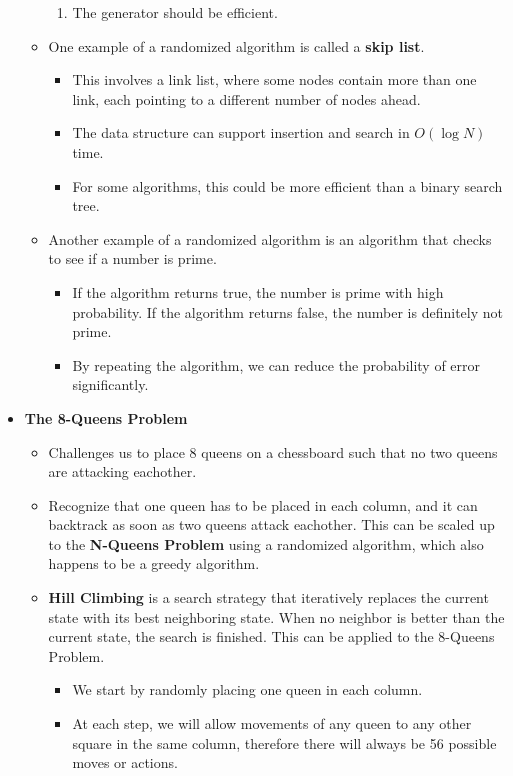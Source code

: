 \documentclass{article}
\begin{document}
\begin{itemize}
\begin{itemize}
\begin{enumerate}
            \item The generator should be efficient.
        \end{enumerate}
        \item One example of a randomized algorithm is called a \textbf{skip list}.
        \begin{itemize}
            \item This involves a link list, where some nodes contain more than one link, each pointing to a different number of nodes ahead.
            \item The data structure can support insertion and search in \(O(\log N)\) time.
            \item For some algorithms, this could be more efficient than a binary search tree.
        \end{itemize}
        \item Another example of a randomized algorithm is an algorithm that checks to see if a number is prime.
        \begin{itemize}
            \item If the algorithm returns true, the number is prime with high probability. If the algorithm returns false, the number is definitely not prime.
            \item By repeating the algorithm, we can reduce the probability of error significantly.
        \end{itemize}
    \end{itemize}
\item \textbf{The 8-Queens Problem}
    \begin{itemize}
        \item Challenges us to place 8 queens on a chessboard such that no two queens are attacking eachother.
        \item Recognize that one queen has to be placed in each column, and it can backtrack as soon as two queens attack eachother. This can be scaled up to the \textbf{N-Queens Problem} using a randomized algorithm, which also happens to be a greedy algorithm.
        \item \textbf{Hill Climbing} is a search strategy that iteratively replaces the current state with its best neighboring state. When no neighbor is better than the current state, the search is finished. This can be applied to the 8-Queens Problem.
        \begin{itemize}
            \item We start by randomly placing one queen in each column.
            \item At each step, we will allow movements of any queen to any other square in the same column, therefore there will always be 56 possible moves or actions.

\end{itemize}
\end{itemize}
\end{itemize}
\end{document}
